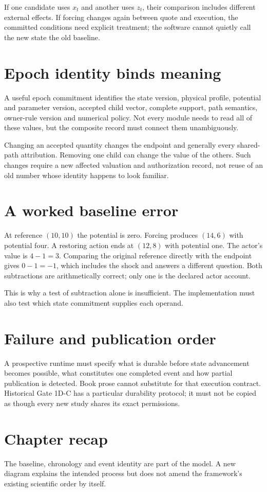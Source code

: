If one candidate uses $x_t$ and another uses $z_t$, their comparison includes
different external effects. If forcing changes again between quote and
execution, the committed conditions need explicit treatment; the software
cannot quietly call the new state the old baseline.

\section{Epoch identity binds meaning}
A useful epoch commitment identifies the state version, physical profile,
potential and parameter version, accepted child vector, complete support,
path semantics, owner-rule version and numerical policy. Not every module
needs to read all of these values, but the composite record must connect
them unambiguously.

Changing an accepted quantity changes the endpoint and generally every
shared-path attribution. Removing one child can change the value of the
others. Such changes require a new affected valuation and authorization
record, not reuse of an old number whose identity happens to look familiar.

\section{A worked baseline error}
At reference $(10,10)$ the potential is zero. Forcing produces $(14,6)$
with potential four. A restoring action ends at $(12,8)$ with potential one.
The actor's value is $4-1=3$. Comparing the original reference directly
with the endpoint gives $0-1=-1$, which includes the shock and answers a
different question. Both subtractions are arithmetically correct; only one
is the declared actor account.

This is why a test of subtraction alone is insufficient. The implementation
must also test which state commitment supplies each operand.

\section{Failure and publication order}
A prospective runtime must specify what is durable before state advancement
becomes possible, what constitutes one completed event and how partial
publication is detected. Book prose cannot substitute for that execution
contract. Historical Gate 1D-C has a particular durability protocol; it
must not be copied as though every new study shares its exact permissions.

\section*{Chapter recap}
The baseline, chronology and event identity are part of the model. A new
diagram explains the intended process but does not amend the framework's
existing scientific order by itself.
